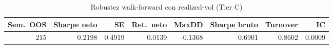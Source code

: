 \begin{table}[htbp]
\centering
\caption{Robustez walk-forward con realized-vol (Tier C)}
\label{tab:rob-realized}
\small
\setlength{\tabcolsep}{4pt}
\begin{tabular}{rrrrrrrr}
\toprule
Sem.\ OOS & Sharpe neto & SE & Ret.\ neto & MaxDD & Sharpe bruto & Turnover & IC \\
\midrule
215 & 0.2198 & 0.4919 & 0.0139 & -0.1368 & 0.6901 & 0.8602 & 0.0009 \\
\bottomrule
\end{tabular}
\end{table}
